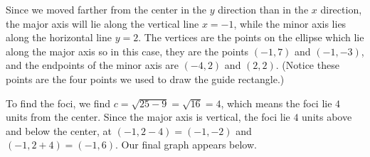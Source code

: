 \documentclass{ximera}
\begin{document}
\begin{example}
\begin{enumerate}
\begin{enumerate}
\begin{image}

\end{image}

Since we moved farther from the center in the $y$ direction than in the $x$ direction, the major axis will lie along the vertical line $x=-1$, while the minor axis lies along the horizontal line $y = 2$.  The vertices are the points on the ellipse which lie along the major axis so in this case, they are the points $(-1,7)$ and $(-1,-3)$, and the endpoints of the minor axis are $(-4,2)$ and $(2,2)$.  (Notice these points are the four points we used to draw the guide rectangle.)  

 

To find the foci, we find $c = \sqrt{25-9} = \sqrt{16} = 4$, which means the foci lie $4$ units from the center. Since the major axis is vertical, the foci lie $4$ units above and below the center, at $(-1, 2-4) = (-1,-2)$ and $(-1, 2+4) = (-1,6)$.  Our final graph appears below.


\end{enumerate}
\end{enumerate}
\end{example}
\end{document}
